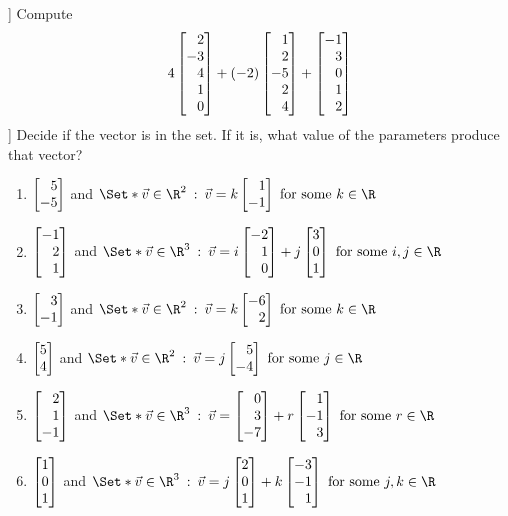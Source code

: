 \begin{exercises}
	\begin{problist}
		\prob[\beezer[VO.C10]]
		Compute
		\[
			4\mat{2\\-3\\4\\1\\0}+
			(-2)\mat{1\\2\\-5\\2\\4}+
			\mat{-1\\3\\0\\1\\2}
		\]
		\prob[\hefferon[2.21,2.22]]
			Decide if the vector is in the set. If it is, what value of the
			parameters produce that vector?
			\begin{enumerate}
				\item $\mat{5\\-5}$ and $\Set*{\vv\in\R^2\given \vv=k\mat{1\\-1}\text{ for some }k\in\R}$
				\item $\mat{-1 \\ 2 \\ 1}$ and
					$\Set*{\vv\in\R^3\given
						\vv=i\mat{-2 \\ 1 \\ 0} +j\mat{3 \\ 0 \\ 1}\text{ for some }i,j\in\R
          }$
					\item
						$\mat{3 \\ -1}$ and $\Set*{
						\vv\in\R^2\given
					\vv=k\mat{-6 \\ 2}\text{ for some } k\in\R}$
					\item
						$\mat{5 \\ 4}$ and $\Set*{\vv\in\R^2\given \vv=j\mat{5 \\ -4}\text{ for some }j\in\R}$
					\item $\mat{2 \\ 1 \\ -1}$ and
						$\Set*{\vv\in\R^3\given \vv=
							\mat{0 \\ 3 \\ -7}
							+r\mat{1 \\ -1 \\ 3}\text{ for some }r\in\R
						}$
					\item $\mat{1 \\ 0 \\ 1}$ and
						$\Set*{\vv\in\R^3\given \vv=
							j\mat{2 \\ 0 \\ 1}
							+k\mat{-3 \\ -1 \\ 1}\text{ for some }j,k\in\R
						}$
			\end{enumerate}
	\end{problist}
\end{exercises}
